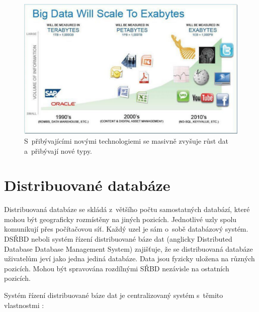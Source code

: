 \begin{figure}[!h]
  \centering
  \includegraphics[width=15cm]{template-fig/big_data_exabytes.pdf}
  \caption{S~přibývajícími novými technologiemi se masivně zvyšuje růst dat a~přibývají nové typy. \cite{rajeshBigData}}
  \label{FIG_BigDataExabytes}
\end{figure}


\section{Distribuované databáze}
Distribuovaná databáze se skládá z~většího počtu samostatných databází, které mohou být geograficky rozmístěny na jiných pozicích. Jednotlivé uzly spolu komunikují přes počítačovou síť. Každý uzel je sám o~sobě databázový systém. DSŘBD neboli systém řízení distribuované báze dat (anglicky Distributed Database Database Management System) zajišťuje, že se distribuovaná databáze uživatelům jeví jako jedna jediná databáze. Data jsou fyzicky uložena na různých pozicích. Mohou být spravována rozdílnými SŘBD nezávisle na ostatních pozicích.

\vspace{0.5cm}

\noindent Systém řízení distribuované báze dat je centralizovaný systém s~těmito vlastnostmi 
\cite{distributedDBMS}:


